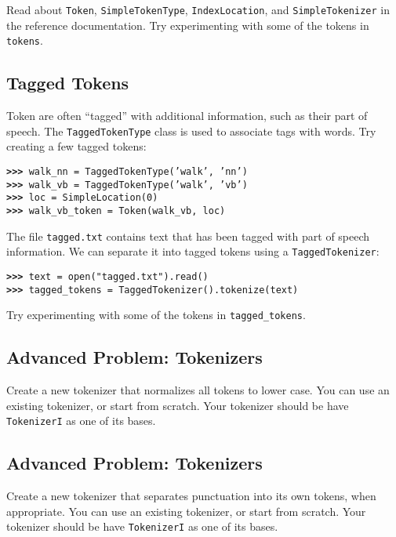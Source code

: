 \documentclass[11pt]{article}
\begin{document}
Read about \texttt{Token}, \texttt{SimpleTokenType},
\texttt{IndexLocation}, and \texttt{SimpleTokenizer} in the reference
documentation.  Try experimenting with some of the tokens in
\texttt{tokens}.

\subsection{Tagged Tokens}

Token are often ``tagged'' with additional information, such as their
part of speech.  The \texttt{TaggedTokenType} class is used to
associate tags with words.  Try creating a few tagged tokens:

\noindent\begin{tabbing}
\tt\textbf{>>>} walk\_nn = TaggedTokenType('walk', 'nn') \\
\tt\textbf{>>>} walk\_vb = TaggedTokenType('walk', 'vb') \\
\tt\textbf{>>>} loc = SimpleLocation(0) \\
\tt\textbf{>>>} walk\_vb\_token = Token(walk\_vb, loc)
\end{tabbing}

The file \texttt{tagged.txt} contains text that has been tagged with
part of speech information.  We can separate it into tagged tokens
using a \texttt{TaggedTokenizer}:

\noindent\begin{tabbing}
\tt\textbf{>>>} text = open("tagged.txt").read() \\
\tt\textbf{>>>} tagged\_tokens = TaggedTokenizer().tokenize(text)
\end{tabbing}

Try experimenting with some of the tokens in \texttt{tagged\_tokens}. 

\subsection{Advanced Problem: Tokenizers}

Create a new tokenizer that normalizes all tokens to lower case.  You
can use an existing tokenizer, or start from scratch.  Your tokenizer
should be have \texttt{TokenizerI} as one of its bases.

\subsection{Advanced Problem: Tokenizers}

Create a new tokenizer that separates punctuation into its own tokens,
when appropriate.  You can use an existing tokenizer, or start from
scratch.  Your tokenizer should be have \texttt{TokenizerI} as one of
its bases.
\end{document}

